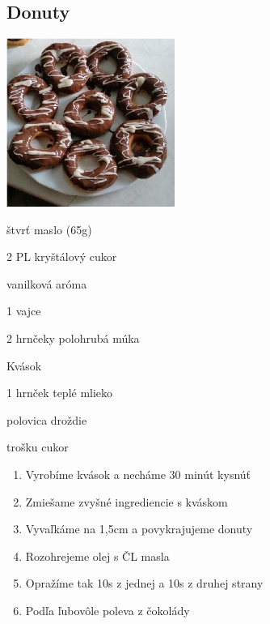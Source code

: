 \setcounter{step}{0}
\subsection{Donuty}

\begin{ingredient}
\includegraphics[height=5.5cm]{images/donuty}
\def\portions{4}%

\begin{main}
	\item štvrť maslo (65g)
	\item 2 PL kryštálový cukor
	\item vanilková aróma
	\item 1 vajce
	\item 2 hrnčeky polohrubá múka
\end{main}
\begin{subingredient}{Kvások}
	\item 1 hrnček teplé mlieko
	\item polovica droždie
	\item trošku cukor
\end{subingredient}
\end{ingredient}
\begin{recipe}

\begin{enumerate}


\item{Vyrobíme kvások a necháme 30 minút kysnúť}
\item{Zmiešame zvyšné ingrediencie s kváskom}
\item{Vyvaľkáme na 1,5cm a povykrajujeme donuty}	
\item{Rozohrejeme olej s ČL masla}
\item{Opražíme tak 10s z jednej a 10s z druhej strany}
\item{Podľa ľubovôle poleva z čokolády}

\end{enumerate}
\end{recipe}

\begin{notes}

\end{notes}
\clearpage	